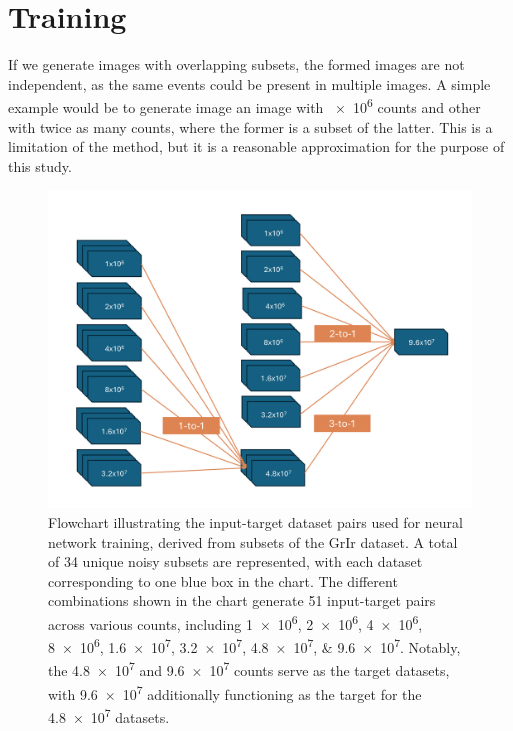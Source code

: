 \section{Training}

If we generate images with overlapping subsets, the formed images are not independent, as the same events could be present in multiple images. A simple example would be to generate image an image with \num{e6} counts and other with twice as many counts, where the former is a subset of the latter. This is a limitation of the method, but it is a reasonable approximation for the purpose of this study.

\begin{figure}[h]
    \centering
    \includegraphics[width=1\linewidth]{images/training_flowchart.pdf}
    \caption{Flowchart illustrating the input-target dataset pairs used for neural network training, derived from subsets of the \gls{GrIr} dataset. A total of \num{34} unique noisy subsets are represented, with each dataset corresponding to one blue box in the chart. The different combinations shown in the chart generate \num{51} input-target pairs across various counts, including \numlist{1e6;2e6;4e6;8e6;1.6e7;3.2e7;4.8e7;9.6e7}. Notably, the \num{4.8e7} and \num{9.6e7} counts serve as the target datasets, with \num{9.6e7} additionally functioning as the target for the \num{4.8e7} datasets.}
    \label{fig:training-data}
\end{figure}


